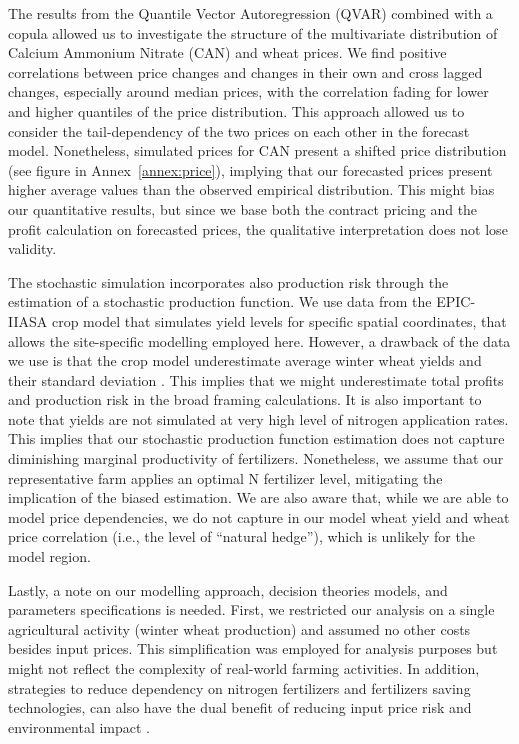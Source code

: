 \documentclass[12pt,a4paper]{article}
\begin{document}
The results from the Quantile Vector Autoregression (QVAR) combined with a copula allowed us to investigate the structure of the multivariate distribution of Calcium Ammonium Nitrate (CAN) and wheat prices. We find positive correlations between price changes and changes in their own and cross lagged changes, especially around median prices, with the correlation fading for lower and higher quantiles of the price distribution. This approach allowed us to consider the tail-dependency of the two prices on each other in the forecast model. Nonetheless, simulated prices for CAN present a shifted price distribution (see figure in Annex~\ref{annex:price}), implying that our forecasted prices present higher average values than the observed empirical distribution. This might bias our quantitative results, but since we base both the contract pricing and the profit calculation on forecasted prices, the qualitative interpretation does not lose validity.

The stochastic simulation incorporates also production risk through the estimation of a stochastic production function. We use data from the EPIC-IIASA crop model that simulates yield levels for specific spatial coordinates, that allows the site-specific modelling employed here. However, a drawback of the data we use is that the crop model underestimate average winter wheat yields and their standard deviation \citep{Balkovic2013}. This implies that we might underestimate total profits and production risk in the broad framing calculations. It is also important to note that yields are not simulated at very high level of nitrogen application rates. This implies that our stochastic production function estimation does not capture diminishing marginal productivity of fertilizers. Nonetheless, we assume that our representative farm applies an optimal N fertilizer level, mitigating the implication of the biased estimation. We are also aware that, while we are able to model price dependencies, we do not capture in our model wheat yield and wheat price correlation (i.e., the level of ``natural hedge''), which is unlikely for the model region.

Lastly, a note on our modelling approach, decision theories models, and parameters specifications is needed. First, we restricted our analysis on a single agricultural activity (winter wheat production) and assumed no other costs besides input prices. This simplification was employed for analysis purposes but might not reflect the complexity of real-world farming activities. In addition, strategies to reduce dependency on nitrogen fertilizers and fertilizers saving technologies, can also have the dual benefit of reducing input price risk and environmental impact \citep{Krein2023}.
\end{document}
